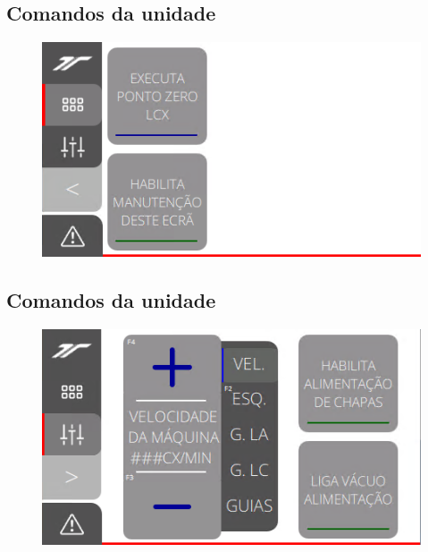\subsection{\small Comandos da unidade}
\begin{figure}
    \centering
    \includegraphics{src/imagesICV/11-KTP400-Feeder/3.png}
\end{figure}

\newpage
\thispagestyle{fancy}
\vspace{\fill}
\subsection{\small Comandos da unidade}
\begin{figure}
    \centering
    \includegraphics{src/imagesICV/11-KTP400-Feeder/4.png}
\end{figure}

\newpage
\thispagestyle{fancy}
\vspace{\fill}
